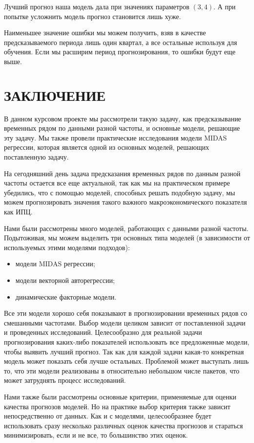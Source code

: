 \documentclass[a4paper, 12pt]{extarticle}
\begin{document}
			Лучший прогноз наша модель дала при значениях параметров $(3,4)$. А при попытке усложнить модель прогноз становится лишь хуже. 
			
			Наименьшее значение ошибки мы можем получить, взяв в качестве предсказываемого периода лишь один квартал, а все остальные используя для обучения. Если мы расширим период прогнозирования, то ошибки будут еще выше.
	 \newpage
	\section{ЗАКЛЮЧЕНИЕ}
	В данном курсовом проекте мы рассмотрели такую задачу, как предсказывание временных рядом по данными разной частоты, и основные модели, решающие эту задачу. Мы также провели практические исследования модели MIDAS регрессии, которая является одной из основных моделей, решающих поставленную задачу.
	
	На сегодняшний день задача предсказания временных рядов по данным разной частоты остается все еще актуальной, так как мы на практическом примере убедились, что с помощью моделей, способных решать подобную задачу, мы можем прогнозировать значения такого важного макроэкономического показателя как ИПЦ.
	
	Нами были рассмотрены много моделей, работающих с данными разной частоты. Подытоживая, мы можем выделить три основных типа моделей (в зависимости от используемых этими моделями подходов):
	\begin{itemize}
		\item модели MIDAS регрессии;
		\item модели векторной авторегрессии;
		\item динамические факторные модели.
	\end{itemize}
	Все эти модели хорошо себя показывают в прогнозировании временных рядов со смешанными частотами. Выбор модели целиком зависит от поставленной задачи и проведенных исследований. Целесообразно для реальной задачи прогнозирования каких-либо показателей использовать все предложенные модели, чтобы выявить лучший прогноз. Так как для каждой задачи какая-то конкретная модель может показать себя лучше остальных. Проблемой может выступать лишь то, что эти модели реализованы в относительно небольшом числе пакетов, что может затруднять процесс исследований.
	
	Нами также были рассмотрены основные критерии, применяемые для оценки качества прогнозов моделей. Но на практике выбор критерия также зависит непосредственно от данных. Как и с моделями, целесообразнее будет использовать сразу несколько различных оценок качества прогнозов и стараться минимизировать, если и не все, то большинство этих оценок.
	
\end{document}
